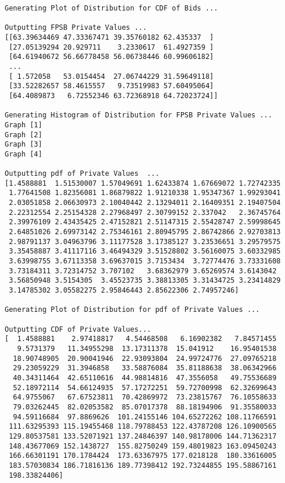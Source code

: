\documentclass{article}
\begin{document}
\begin{lstlisting}
Generating Plot of Distribution for CDF of Bids ...

Outputting FPSB Private Values ...
[[63.39634469 47.33367471 39.35760182 62.435337  ]
 [27.05139294 20.929711    3.2330617  61.4927359 ]
 [64.61940672 56.66778458 56.06738446 60.99606182]
 ...
 [ 1.572058   53.0154454  27.06744229 31.59649118]
 [33.52282657 58.4615557   9.73519983 57.60495064]
 [64.4089873   6.72552346 63.72368918 64.72023724]]

Generating Histogram of Distribution for FPSB Private Values ...
Graph [1]
Graph [2]
Graph [3]
Graph [4]

Outputting pdf of Private Values  ...
[1.4588881  1.51530007 1.57049691 1.62433874 1.67669072 1.72742335
 1.77641508 1.82356081 1.86879822 1.91210338 1.95347367 1.99293041
 2.03051858 2.06630973 2.10040442 2.13294011 2.16409351 2.19407504
 2.22312554 2.25154328 2.27968497 2.30799152 2.337042   2.36745764
 2.39976109 2.43435425 2.47152821 2.51147315 2.55428747 2.59998645
 2.64851026 2.69973142 2.75346161 2.80945795 2.86742866 2.92703813
 2.98791137 3.04963796 3.11177528 3.17385127 3.23536651 3.29579575
 3.35458887 3.41117116 3.46494329 3.51528802 3.56160075 3.60332985
 3.63998755 3.67113358 3.69637015 3.7153434  3.72774476 3.73331608
 3.73184311 3.72314752 3.707102   3.68362979 3.65269574 3.6143042
 3.56850948 3.5154305  3.45523735 3.38813305 3.31434725 3.23414829
 3.14785302 3.05582275 2.95846443 2.85622306 2.74957246]

Generating Plot of Distribution for pdf of Private Values ...

Outputting CDF of Private Values...
[  1.4588881    2.97418817   4.54468508   6.16902382   7.84571455
   9.5731379   11.34955298  13.17311378  15.041912    16.95401538
  18.90748905  20.90041946  22.93093804  24.99724776  27.09765218
  29.23059229  31.3946858   33.58876084  35.81188638  38.06342966
  40.34311464  42.65110616  44.98814816  47.3556058   49.75536689
  52.18972114  54.66124935  57.17272251  59.72700998  62.32699643
  64.9755067   67.67523811  70.42869972  73.23815767  76.10558633
  79.03262445  82.02053582  85.07017378  88.18194906  91.35580033
  94.59116684  97.8869626  101.24155146 104.65272262 108.11766591
 111.63295393 115.19455468 118.79788453 122.43787208 126.10900565
 129.80537581 133.52071921 137.24846397 140.98178006 144.71362317
 148.43677069 152.1438727  155.82750249 159.48019823 163.09450243
 166.66301191 170.1784424  173.63367975 177.0218128  180.33616005
 183.57030834 186.71816136 189.77398412 192.73244855 195.58867161
 198.33824406]


\end{lstlisting}
\end{document}

